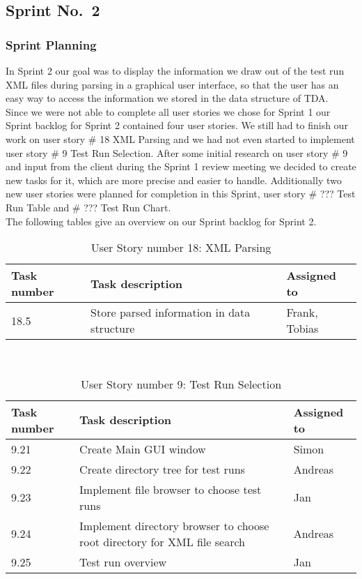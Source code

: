 \subsection{Sprint No.~2}

\subsubsection*{Sprint Planning}

In Sprint 2 our goal was to display the information we draw out of the test run XML files during parsing in a graphical user interface, so that the user has an easy way to access the information we stored in the data structure of TDA. \\ 
Since we were not able to complete all user stories we chose for Sprint 1 our Sprint backlog for Sprint 2 contained four user stories. We still had to finish our work on user story \# 18 XML Parsing and we had not even started to implement user story \# 9 Test Run Selection. After some initial research on user story \# 9 and input from the client during the Sprint 1 review meeting we decided to create new tasks for it, which are more precise and easier to handle. Additionally two new user stories were planned for completion in this Sprint, user story \# ??? Test Run Table and \# ??? Test Run Chart. \\ 
The following tables give an overview on our Sprint backlog for Sprint 2. \\ 

\newpage 

\begin{table}[h]
  \caption{User Story number 18: XML Parsing}
  \label{US_Parsing2}
  \centering
  \begin{tabular}{p{1.5cm}|p{9cm}|p{3cm}|}
  	Task number & Task description & Assigned to \\ 
  	\hline
  	\hline
  	18.5 & Store parsed information in data structure & Frank, Tobias \\ 
  	\hline
  \end{tabular}
\end{table} 

\ \\

\begin{table}[h]
  \caption{User Story number 9: Test Run Selection}
  \label{US_Selection2}
  \centering
  \begin{tabular}{p{1.5cm}|p{9cm}|p{3cm}|}
  	Task number & Task description & Assigned to \\ 
  	\hline
  	\hline
  	9.21 & Create Main GUI window & Simon \\ 
  	\hline
  	9.22 & Create directory tree for test runs & Andreas \\ 
  	\hline
  	9.23 & Implement file browser to choose test runs & Jan \\
  	\hline
  	9.24 & Implement directory browser to choose root directory for XML file search & Andreas \\
  	\hline
  	9.25 & Test run overview & Jan \\ 
  	\hline
  \end{tabular}
\end{table} 

